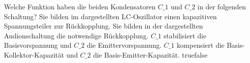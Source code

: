     {Welche Funktion haben die beiden Kondensatoren $C\_1$ und $C\_2$ in der folgenden Schaltung?}
    {Sie bilden im dargestellten LC-Oszillator einen kapazitiven Spannungsteiler zur Rückkopplung.}
    {Sie bilden in der dargestellten Audionschaltung die notwendige Rückkopplung.}
    {$C\_1$ stabilisiert die Basisvorspannung und $C\_2$ die Emittervorspannung.}
    {$C\_1$ kompensiert die Basis-Kollektor-Kapazität und $C\_2$ die Basis-Emitter-Kapazität.}
    {true}{false}